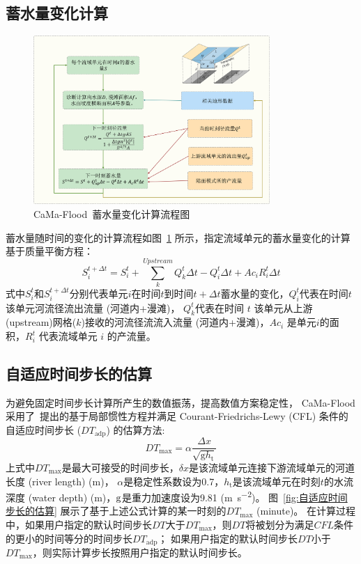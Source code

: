 \subsection{蓄水量变化计算}
{
  \begin{figure}[htbp]
    \centering
    \includegraphics[width=0.8\textwidth]{Figures/陆地表面的水分循环/蓄水量变化计算流程图.png}
    \caption{CaMa-Flood~蓄水量变化计算流程图 }
    \label{fig:蓄水量变化计算流程图}
  \end{figure}
}
蓄水量随时间的变化的计算流程如图~\ref{fig:蓄水量变化计算流程图} 所示，指定流域单元的蓄水量变化的计算基于质量平衡方程：
\begin{equation}
  S_{i}^{t+\Delta t}=S_{i}^{t}+\sum_{k}^{Upstream} Q_{k}^{t} \Delta t-Q_{i}^{t} \Delta t+A c_{i} R_{i}^{t} \Delta t
\end{equation}
式中$S_{i}^{t}$和$S_{i}^{t+\Delta t}$分别代表单元$i$在时间$t$到时间$t+\Delta t$蓄水量的变化，$Q_i^t$代表在时间$t$该单元河流径流出流量 (河道内+漫滩)，
$Q_k^t$代表在时间 $t$ 该单元从上游(upstream)网格($k$)接收的河流径流流入流量 (河道内+漫滩)，$Ac_i$ 是单元$i$的面积，$R_i^t$ 代表流域单元 $i$ 的产流量。


\subsection{自适应时间步长的估算}
为避免固定时间步长计算所产生的数值振荡，提高数值方案稳定性，
CaMa-Flood 采用了~\citet{bates2010}提出的基于局部惯性方程并满足 Courant-Friedrichs-Lewy (CFL)
条件的自适应时间步长 ($DT_{\mathrm{adp}}$) 的估算方法:
\begin{equation}
  {DT}_{\max }={\alpha} \frac{\Delta x}{\sqrt{{\mathrm {g}} h_{\mathrm{t}}}}
\end{equation}
上式中$DT_{\mathrm{max}}$是最大可接受的时间步长，$\delta{x}$是该流域单元连接下游流域单元的河道长度 (river length) (\unit{m})，
$\alpha$是稳定性系数设为0.7，$h_{\mathrm {t}} $是该流域单元在时刻$t$的水流深度 (water depth) (\unit{m})，$\rm g$是重力加速度设为9.81 (\unit{m.s^{-2}})。
图~\ref{fig:自适应时间步长的估算} 展示了基于上述公式计算的某一时刻的$DT_{\mathrm{max}}$ (minute)。
在计算过程中，如果用户指定的默认时间步长$DT$大于$DT_{\mathrm{max}}$，则$DT$将被划分为满足$CFL$条件的更小的时间等分的时间步长$DT_{\mathrm{adp}}$；
如果用户指定的默认时间步长$DT$小于$DT_{\mathrm{max}}$，则实际计算步长按照用户指定的默认时间步长。

